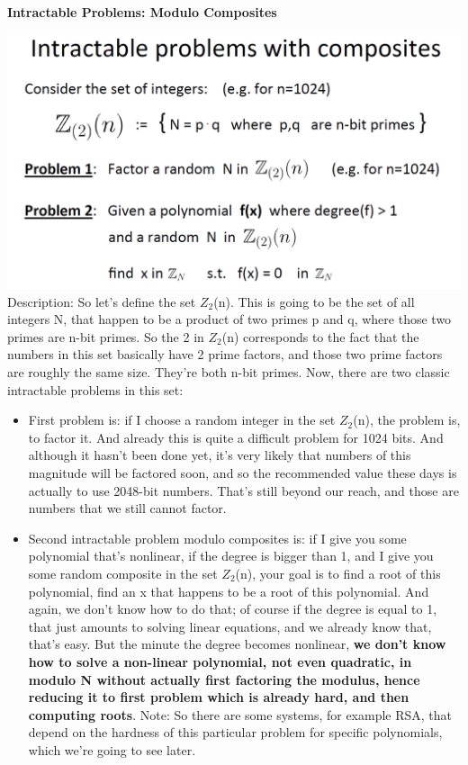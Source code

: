 \documentclass[11pt]{article}
\makeatletter
\def\maxwidth{\ifdim\Gin@nat@width>\linewidth\linewidth
    \else\Gin@nat@width\fi}
\let\Oldincludegraphics\includegraphics
\renewcommand{\includegraphics}[1]{\Oldincludegraphics[width=.8\maxwidth]{#1}}
\providecommand{\tightlist}{%
      \setlength{\itemsep}{0pt}\setlength{\parskip}{0pt}}
\makeatother
\begin{document}
\textbf{Intractable Problems: Modulo Composites}

\includegraphics{./Images/NT-IntracProb-Composites.png} Description: So
let's define the set \(Z_{2}\)(n). This is going to be the set of all
integers N, that happen to be a product of two primes p and q, where
those two primes are n-bit primes. So the 2 in \(Z_{2}\)(n) corresponds
to the fact that the numbers in this set basically have 2 prime factors,
and those two prime factors are roughly the same size. They're both
n-bit primes. Now, there are two classic intractable problems in this
set:

\begin{itemize}
\tightlist
\item
  First problem is: if I choose a random integer in the set
  \(Z_{2}\)(n), the problem is, to factor it. And already this is quite
  a difficult problem for 1024 bits. And although it hasn't been done
  yet, it's very likely that numbers of this magnitude will be factored
  soon, and so the recommended value these days is actually to use
  2048-bit numbers. That's still beyond our reach, and those are numbers
  that we still cannot factor.
\item
  Second intractable problem modulo composites is: if I give you some
  polynomial that's nonlinear, if the degree is bigger than 1, and I
  give you some random composite in the set \(Z_{2}\)(n), your goal is
  to find a root of this polynomial, find an x that happens to be a root
  of this polynomial. And again, we don't know how to do that; of course
  if the degree is equal to 1, that just amounts to solving linear
  equations, and we already know that, that's easy. But the minute the
  degree becomes nonlinear, \textbf{we don't know how to solve a
  non-linear polynomial, not even quadratic, in modulo N without
  actually first factoring the modulus, hence reducing it to first
  problem which is already hard, and then computing roots}. Note: So
  there are some systems, for example RSA, that depend on the hardness
  of this particular problem for specific polynomials, which we're going
  to see later.
\end{itemize}
\end{document}
